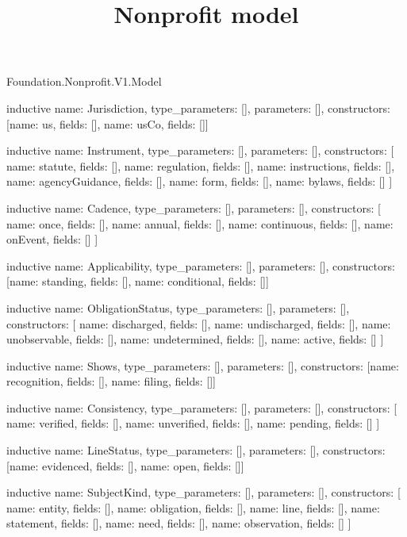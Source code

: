 \begin{lexlean}{Foundation.Nonprofit.V1.Model}
\title{Nonprofit model}
\begin{semanticmodule}
inductive{
  name: Jurisdiction,
  type_parameters: [],
  parameters: [],
  constructors: [{name: us, fields: []}, {name: usCo, fields: []}]
}

inductive{
  name: Instrument,
  type_parameters: [],
  parameters: [],
  constructors: [
    {name: statute, fields: []},
    {name: regulation, fields: []},
    {name: instructions, fields: []},
    {name: agencyGuidance, fields: []},
    {name: form, fields: []},
    {name: bylaws, fields: []}
  ]
}

inductive{
  name: Cadence,
  type_parameters: [],
  parameters: [],
  constructors: [
    {name: once, fields: []},
    {name: annual, fields: []},
    {name: continuous, fields: []},
    {name: onEvent, fields: []}
  ]
}

inductive{
  name: Applicability,
  type_parameters: [],
  parameters: [],
  constructors: [{name: standing, fields: []}, {name: conditional, fields: []}]
}

inductive{
  name: ObligationStatus,
  type_parameters: [],
  parameters: [],
  constructors: [
    {name: discharged, fields: []},
    {name: undischarged, fields: []},
    {name: unobservable, fields: []},
    {name: undetermined, fields: []},
    {name: active, fields: []}
  ]
}

inductive{
  name: Shows,
  type_parameters: [],
  parameters: [],
  constructors: [{name: recognition, fields: []}, {name: filing, fields: []}]
}

inductive{
  name: Consistency,
  type_parameters: [],
  parameters: [],
  constructors: [
    {name: verified, fields: []},
    {name: unverified, fields: []},
    {name: pending, fields: []}
  ]
}

inductive{
  name: LineStatus,
  type_parameters: [],
  parameters: [],
  constructors: [{name: evidenced, fields: []}, {name: open, fields: []}]
}

inductive{
  name: SubjectKind,
  type_parameters: [],
  parameters: [],
  constructors: [
    {name: entity, fields: []},
    {name: obligation, fields: []},
    {name: line, fields: []},
    {name: statement, fields: []},
    {name: need, fields: []},
    {name: observation, fields: []}
  ]
}


\end{semanticmodule}
\end{lexlean}
